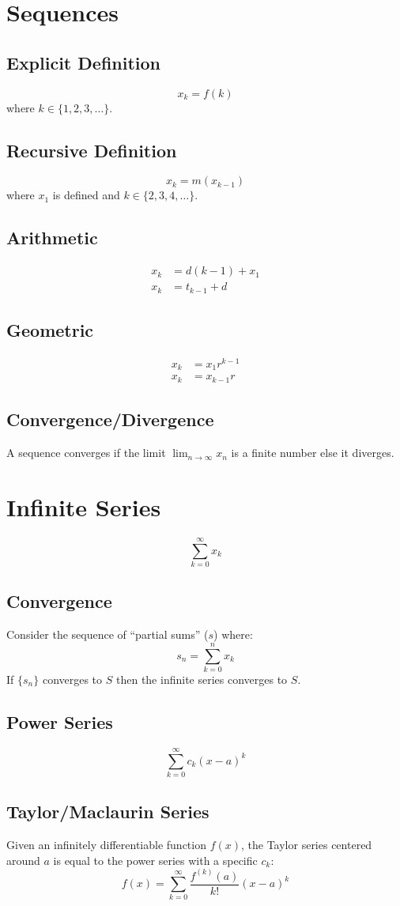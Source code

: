 \documentclass[12pt]{article}
\newcommand*{\rmaskip}{\setlength{\abovedisplayskip}{0pt}}
\newcommand*{\rmbskip}{\setlength{\belowdisplayskip}{0pt}}
\newcommand*{\rmskip}{\rmaskip \rmbskip}
\newcommand*{\isum}[1][k]{\sum_{#1=0}^\infty}
\begin{document}
\section*{Sequences}
\subsection*{Explicit Definition}
\[
  x_k = f(k)
\]
where \(k \in \{1,2,3,\dots\}\).
\subsection*{Recursive Definition}
\[
  x_k = m(x_{k-1})
\]
where \(x_1\) is defined and \(k \in \{2,3,4,\dots\}\).
\subsection*{Arithmetic}
{\rmskip\begin{align*}
  x_k &= d(k-1) + x_1\\
  x_k &= t_{k-1} + d
\end{align*}}%
\subsection*{Geometric}
{\rmskip\begin{align*}
  x_k &= x_1r^{k-1}\\
  x_k &= x_{k-1} r
\end{align*}}%
\subsection*{Convergence\slash Divergence}
A sequence converges if the limit \(\displaystyle\lim_{n \to \infty} x_n\) is
a finite number else it diverges.
\section*{Infinite Series}
\[
  \isum x_k
\]
\subsection*{Convergence}
Consider the sequence of ``partial sums'' (\(s\)) where:
\[
  s_n = \sum_{k=0}^n x_k
\]
If \(\{s_n\}\) converges to \(S\) then the infinite series converges to \(S\).
\subsection*{Power Series}
\[
  \isum c_k{(x-a)}^k
\]
\subsection*{Taylor/Maclaurin Series}
Given an infinitely differentiable function \(f(x)\), the Taylor series
centered around \(a\) is equal to the power series with a specific \(c_k\):
\[
  f(x) = \isum \frac{f^{(k)}(a)}{k!}{(x-a)}^k
\]
\end{document}

